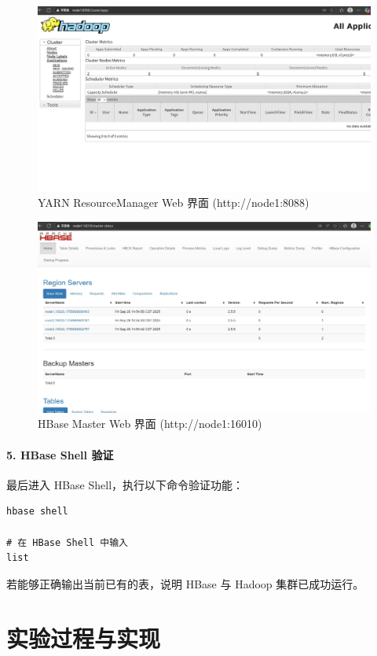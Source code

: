 \documentclass[]{bitreport}
\begin{document}
\begin{figure}[H]
  \centering
  \includegraphics[width=0.9\linewidth]{figures/web_yarn.jpg}
  \caption{YARN ResourceManager Web 界面 (http://node1:8088)}
  \label{fig:web_yarn}
\end{figure}

\begin{figure}[H]
  \centering
  \includegraphics[width=0.9\linewidth]{figures/web_hbase.jpg}
  \caption{HBase Master Web 界面 (http://node1:16010)}
  \label{fig:web_hbase}
\end{figure}

\paragraph{5. HBase Shell 验证}
最后进入 HBase Shell，执行以下命令验证功能：
\begin{lstlisting}[style=shell]
hbase shell

# 在 HBase Shell 中输入
list
\end{lstlisting}

若能够正确输出当前已有的表，说明 HBase 与 Hadoop 集群已成功运行。

\section{实验过程与实现}
\end{document}
